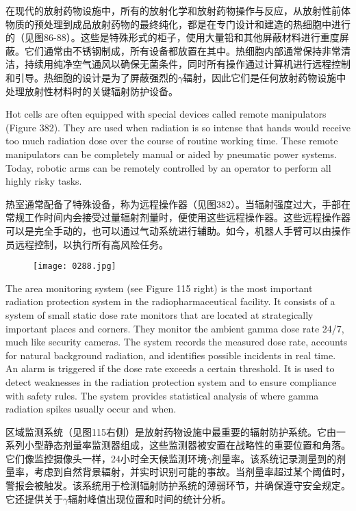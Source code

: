 \documentclass[dvipsnames, svgnames,a4paper,11pt]{article}
\begin{document}
在现代的放射药物设施中，所有的放射化学和放射药物操作与反应，从放射性前体物质的预处理到成品放射药物的最终纯化，都是在专门设计和建造的热细胞中进行的（见图86-88）。这些是特殊形式的柜子，使用大量铅和其他屏蔽材料进行重度屏蔽。它们通常由不锈钢制成，所有设备都放置在其中。热细胞内部通常保持非常清洁，持续用纯净空气通风以确保无菌条件，同时所有操作通过计算机进行远程控制和引导。热细胞的设计是为了屏蔽强烈的$\gamma$辐射，因此它们是任何放射药物设施中处理放射性材料时的关键辐射防护设备。

Hot cells are often equipped with special devices called remote manipulators (Figure 382). They are used when radiation is so intense that hands would receive too much radiation dose over the course of routine working time. These remote manipulators can be completely manual or aided by pneumatic power systems. Today, robotic arms can be remotely controlled by an operator to perform all highly risky tasks.


热室通常配备了特殊设备，称为远程操作器（见图382）。当辐射强度过大，手部在常规工作时间内会接受过量辐射剂量时，便使用这些远程操作器。这些远程操作器可以是完全手动的，也可以通过气动系统进行辅助。如今，机器人手臂可以由操作员远程控制，以执行所有高风险任务。

\begin{figure}[h]
    \centering
    \texttt{[image: 0288.jpg]} 
     \label{fig382}
\end{figure}


The area monitoring system (see Figure 115 right) is the most important radiation protection system in the radiopharmaceutical facility. It consists of a system of small static dose rate monitors that are located at strategically important places and corners. They monitor the ambient gamma dose rate 24/7, much like security cameras. The system records the measured dose rate, accounts for natural background radiation, and identifies possible incidents in real time. An alarm is triggered if the dose rate exceeds a certain threshold. It is used to detect weaknesses in the radiation protection system and to ensure compliance with safety rules. The system provides statistical analysis of where gamma radiation spikes usually occur and when.

区域监测系统（见图115右侧）是放射药物设施中最重要的辐射防护系统。它由一系列小型静态剂量率监测器组成，这些监测器被安置在战略性的重要位置和角落。它们像监控摄像头一样，24小时全天候监测环境$\gamma$剂量率。该系统记录测量到的剂量率，考虑到自然背景辐射，并实时识别可能的事故。当剂量率超过某个阈值时，警报会被触发。该系统用于检测辐射防护系统的薄弱环节，并确保遵守安全规定。它还提供关于$\gamma$辐射峰值出现位置和时间的统计分析。
\end{document}
